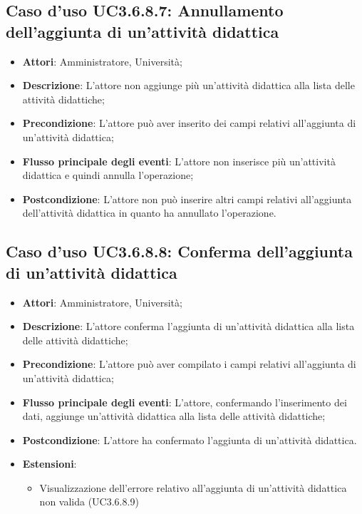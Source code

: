\subsection{Caso d'uso \texorpdfstring{UC3.6.8.7}{UC3.6.8.7}: Annullamento dell’aggiunta di un’attività didattica}
\begin{itemize}
\item \textbf{Attori}: Amministratore, Università;
\item \textbf{Descrizione}: L'attore non aggiunge più un'attività didattica alla lista delle attività didattiche;

\item \textbf{Precondizione}: L'attore può aver inserito dei campi relativi all'aggiunta di un'attività didattica;

\item \textbf{Flusso principale degli eventi}: L'attore non inserisce più un'attività didattica e quindi annulla l'operazione;

\item \textbf{Postcondizione}: L'attore non può inserire altri campi relativi all'aggiunta dell'attività didattica in quanto ha annullato l'operazione.

\end{itemize}
\subsection{Caso d'uso \texorpdfstring{UC3.6.8.8}{UC3.6.8.8}: Conferma dell’aggiunta di un’attività didattica}
\begin{itemize}
\item \textbf{Attori}: Amministratore, Università;
\item \textbf{Descrizione}: L'attore conferma l'aggiunta di un’attività didattica alla lista delle attività didattiche;

\item \textbf{Precondizione}: L'attore può aver compilato i campi relativi all'aggiunta di un’attività didattica;

\item \textbf{Flusso principale degli eventi}: L'attore, confermando l'inserimento dei dati, aggiunge un’attività didattica alla lista delle attività didattiche;

\item \textbf{Postcondizione}: L'attore ha confermato l'aggiunta di un’attività didattica.

\item \textbf{Estensioni}:
\begin{itemize}
\item Visualizzazione dell'errore relativo all’aggiunta di un’attività didattica non valida (UC3.6.8.9)
\end{itemize}
\end{itemize}
